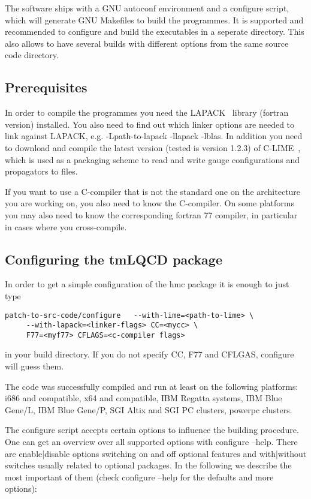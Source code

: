 The software ships with a GNU autoconf environment and a configure
script, which will generate GNU Makefiles to build the programmes. It
is supported and recommended to configure and build the executables in
a seperate directory. This also allows to have several builds with
different options from the same source code directory. 

\subsection{Prerequisites}

In order to compile the programmes you need the {\ttfamily
  LAPACK}~\cite{lapack:web} library (fortran version) installed. You also
need to find out which linker options are needed to link against
{\ttfamily LAPACK}, e.g. {\ttfamily -Lpath-to-lapack -llapack
  -lblas}. In addition you need to download and compile the latest
version (tested is version 1.2.3) of {\ttfamily
  C-LIME}~\cite{lime:web}, which is used as a packaging scheme to
read and write gauge configurations and propagators to files.

If you want to use a C-compiler that is not the standard one on the
architecture you are working on, you also need to know the
C-compiler. On some platforms you may also need to know the
corresponding fortran 77 compiler, in particular in cases where you
cross-compile. 

\subsection{Configuring the tmLQCD package}
\label{sec:config}

In order to get a simple configuration of the hmc package it is enough
to just type 
\begin{verbatim}
patch-to-src-code/configure   --with-lime=<path-to-lime> \
     --with-lapack=<linker-flags> CC=<mycc> \
     F77=<myf77> CFLAGS=<c-compiler flags>
\end{verbatim}
in your build directory. If 
you do not  specify {\ttfamily CC, F77} and {\ttfamily CFLGAS},
{\ttfamily configure} will guess them.

The code was successfully compiled and run at least on the following
platforms: i686 and compatible, x64 and compatible, IBM Regatta
systems, IBM Blue Gene/L, IBM Blue Gene/P, SGI Altix and SGI PC
clusters, powerpc clusters.

The configure script accepts certain options to influence the building
procedure. One can get an overview over all supported options with
{\ttfamily configure --help}. There are {\ttfamily enable|disable}
options switching on and off optional features and {\ttfamily
  with|without} switches usually related to optional packages. In the
following we describe the most important of them (check {\ttfamily
  configure --help} for the defaults and more options):

